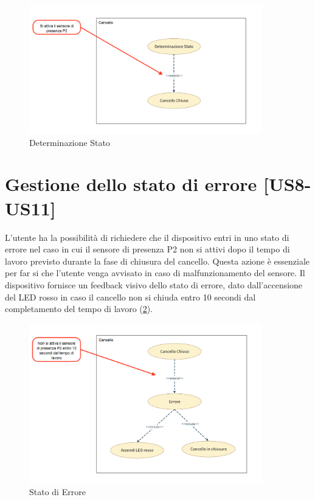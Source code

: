 \begin{figure}[H]
    \centering
    \includegraphics[width=0.9\textwidth]{figures/usecase_7.png}
    \caption{Determinazione Stato}
    \label{usecase7}
\end{figure}


\section{Gestione dello stato di errore [US8-US11]}
L'utente ha la possibilità di richiedere che il dispositivo entri in uno stato di errore nel caso in cui il sensore di presenza P2 non si attivi dopo il tempo di lavoro previsto durante la fase di chiusura del cancello. Questa azione è essenziale per far si che l'utente venga avvisato in caso di malfunzionamento del sensore.
Il dispositivo fornisce un feedback visivo dello stato di errore, dato dall'accensione del LED rosso in caso il cancello non si chiuda entro 10 secondi dal completamento del tempo di lavoro (\ref{usecase8}).

\begin{figure}[H]
    \centering
    \includegraphics[width=0.9\textwidth]{figures/usecase_8.png}
    \caption{Stato di Errore}
    \label{usecase8}
\end{figure}


